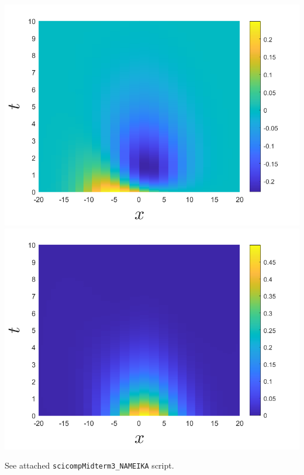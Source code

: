 \documentclass{article}
\begin{document}
\begin{center}
    \newline
    \includegraphics[scale = 0.35]{scicompProb3utop}
    \includegraphics[scale = 0.35]{scicompProb3vtop}
\end{center}
See attached \verb+scicompMidterm3_NAMEIKA+ script.
\end{document}
